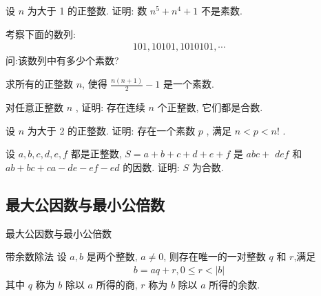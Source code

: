 \documentclass[aspectratio=169]{ctexbeamer}
\theoremstyle{definition}
\begin{document}
\begin{frame}[t]
	\begin{example}
		设 $n$ 为大于 1 的正整数. 证明: 数 $n^{5}+n^{4}+1$ 不是素数.
	\end{example}
\end{frame}

\begin{frame}[t]
	\begin{example}
		考察下面的数列:
		\begin{align*}
			101,10101,1010101, \cdots
		\end{align*}
		问:该数列中有多少个素数?
	\end{example}
\end{frame}

\begin{frame}[t]
	\begin{example}
		求所有的正整数 $n$, 使得 $\frac{n(n+1)}{2}-1$ 是一个素数.
	\end{example}
\end{frame}

\begin{frame}[t]
	\begin{example}
		对任意正整数 $n$ , 证明: 存在连续 $n$ 个正整数, 它们都是合数.
	\end{example}
\end{frame}

\begin{frame}[t]
	\begin{example}
		设 $n$ 为大于 2 的正整数. 证明: 存在一个素数 $p$ , 满足 $n<p<n!$ .
	\end{example}
\end{frame}

\begin{frame}[t]
	\begin{example}
		设 $a ,  b ,  c ,  d ,  e ,  f$ 都是正整数,  $S=a+b+c+d+e+f$ 是 $a b c+$ $d e f$ 和 $a b+b c+c a-d e-e f-e d$ 的因数. 证明: $S$ 为合数.
	\end{example}
\end{frame}
\subsection{最大公因数与最小公倍数}
\begin{frame}{最大公因数与最小公倍数}
	\begin{block}{带余数除法}
		设 $a ,  b$ 是两个整数, $a \neq 0$, 则存在唯一的一对整数 $q$ 和 $r$,满足
		\begin{align*}
			b=a q+r, 0 \leqslant r<|b|
		\end{align*}
		其中 $q$ 称为 $b$ 除以 $a$ 所得的商, $r$ 称为 $b$ 除以 $a$ 所得的余数.\\
	\end{block}
\end{frame}
\end{document}
